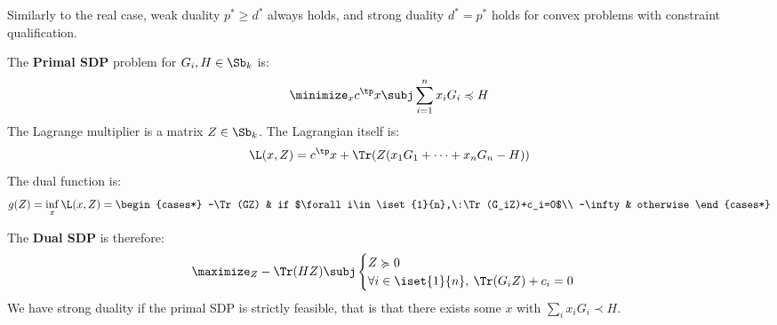 Similarly to the real case, weak duality $p^*\geq d^*$ always holds, and strong duality $d^*=p^*$ holds for convex problems with constraint qualification.

\begin{example}
    The \textbf{Primal SDP} problem for $G_i, H\in\Sb_k$ is:
    \begin{equation*}
        \minimize_x c^\tp x \subj \sum_{i=1}^n x_i G_i \preccurlyeq H
    \end{equation*}
    The Lagrange multiplier is a matrix $Z\in\Sb_k$. The Lagrangian itself is:
    \begin{equation*}
        \L(x,Z) = c^\tp x+\Tr(Z(x_1 G_1+\dots+x_n G_n - H))
    \end{equation*}
    The dual function is:
    \begin{equation*}
        g(Z) = \inf_x \L(x, Z) = \begin{cases*}
            -\Tr(GZ) & if $\forall i\in\iset{1}{n},\:\Tr(G_iZ)+c_i=0$\\
            -\infty & otherwise
        \end{cases*}
    \end{equation*}

    The \textbf{Dual SDP} is therefore:
    \begin{equation*}
        \maximize_Z -\Tr(HZ) \subj \begin{cases}
            Z\succcurlyeq 0\\
            \forall i\in\iset{1}{n}, \: \Tr(G_i Z) + c_i = 0
        \end{cases}
    \end{equation*}
    We have strong duality if the primal SDP is strictly feasible, that is that there exists some $x$ with $\sum_i x_iG_i\prec H$.
\end{example}